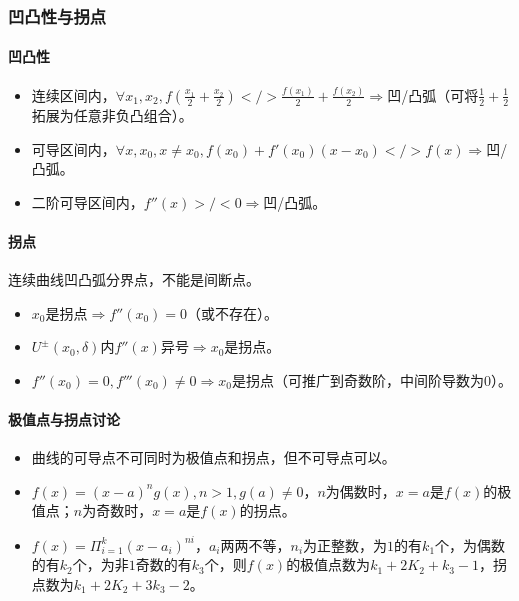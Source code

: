 \documentclass[
12pt, %
a4paper, 
oneside, %
headinclude,footinclude, %
]{scrartcl}
\begin{document}
\subsubsection[凹凸性与拐点]{凹凸性与拐点}
\paragraph{凹凸性}
\begin{itemize}
\item 连续区间内，$ \forall x_1,x_2, f(\frac{x_1}{2} + \frac{x_2}{2}) </> \frac{f(x_1)}{2} + \frac{f(x_2)}{2} $$ \Rightarrow $凹/凸弧（可将$ \frac{1}{2} + \frac{1}{2} $拓展为任意非负凸组合）。
\item 可导区间内，$ \forall x,x_0, x \neq x_0, f(x_0) + f'(x_0) (x - x_0) </> f(x) $$ \Rightarrow $凹/凸弧。
\item 二阶可导区间内，$ f''(x) >/< 0 $$ \Rightarrow $凹/凸弧。
\end{itemize}
\paragraph{拐点}
连续曲线凹凸弧分界点，不能是间断点。
\begin{itemize}
\item $ x_0 $是拐点$ \Rightarrow $$ f''(x_0) = 0 $（或不存在）。
\item $ U^{\pm}(x_0, \delta) $内$ f''(x) $异号$ \Rightarrow $$ x_0 $是拐点。
\item $ f''(x_0) = 0, f'''(x_0) \neq 0 $$ \Rightarrow $$ x_0 $是拐点（可推广到奇数阶，中间阶导数为$ 0 $）。
\end{itemize}
\paragraph{极值点与拐点讨论}
\begin{itemize}
\item 曲线的可导点不可同时为极值点和拐点，但不可导点可以。
\item $ f(x) = (x - a)^n g(x), n > 1, g(a) \neq 0 $，$ n $为偶数时，$ x = a $是$ f(x) $的极值点；$ n $为奇数时，$ x = a $是$ f(x) $的拐点。
\item $ f(x) = \Pi_{i = 1}^k (x - a_i)^{ni} $，$ a_i $两两不等，$ n_i $为正整数，为$ 1 $的有$ k_1 $个，为偶数的有$ k_2 $个，为非$ 1 $奇数的有$ k_3 $个，则$ f(x) $的极值点数为$ k_1 + 2K_2 + k_3 - 1 $，拐点数为$ k_1 + 2K_2 + 3k_3 - 2 $。
\end{itemize}
\end{document}
